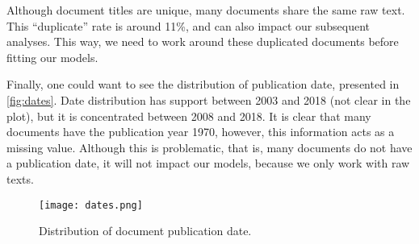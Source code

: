             Although document titles are unique, many documents share the same raw text. This ``duplicate'' rate is around 11\%, and can also impact our subsequent analyses. This way, we need to work around these duplicated documents before fitting our models.

            Finally, one could want to see the distribution of publication date, presented in \autoref{fig:dates}. Date distribution has support between 2003 and 2018 (not clear in the plot), but it is concentrated between 2008 and 2018. It is clear that many documents have the publication year 1970, however, this information acts as a missing value. Although this is problematic, that is, many documents do not have a publication date, it will not impact our models, because we only work with raw texts.

            \begin{figure}[H]
                  \texttt{[image: dates.png]}
                  \caption{Distribution of document publication date.}
                  \label{fig:dates}
            \end{figure}
            